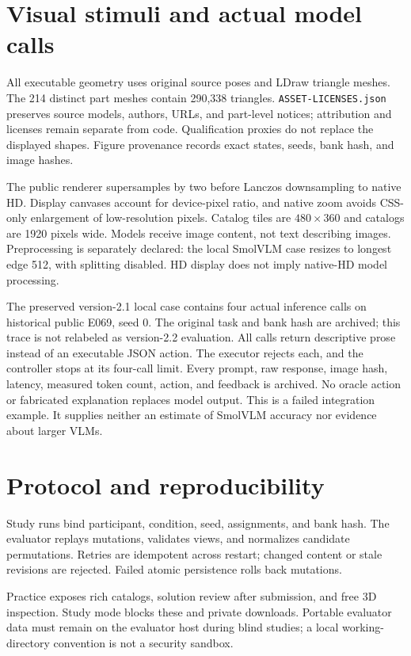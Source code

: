 \section{Visual stimuli and actual model calls}
All executable geometry uses original source poses and LDraw triangle
meshes. The 214 distinct part meshes contain 290,338 triangles.
\texttt{ASSET-LICENSES.json} preserves source models, authors, URLs, and
part-level notices; attribution and licenses remain separate from code.
Qualification proxies do not replace the displayed shapes.
Figure provenance records exact states, seeds, bank hash, and image hashes.

The public renderer supersamples by two before Lanczos downsampling to
native HD. Display canvases account for device-pixel ratio, and native
zoom avoids CSS-only enlargement of low-resolution pixels.
Catalog tiles are $480\times360$ and catalogs are 1920 pixels wide.
Models receive image content, not text describing images. Preprocessing
is separately declared: the local SmolVLM case resizes to longest edge
512, with splitting disabled. HD display does not imply native-HD model
processing.

The preserved version-2.1 local case contains four actual inference calls
on historical public E069, seed 0. The original task and bank hash are
archived; this trace is not relabeled as version-2.2 evaluation.
All calls return descriptive prose instead of an executable JSON action.
The executor rejects each, and the controller stops at its four-call limit.
Every prompt, raw response, image hash, latency, measured token count,
action, and feedback is archived. No oracle action or fabricated explanation
replaces model output. This is a failed integration example. It supplies
neither an estimate of SmolVLM accuracy nor evidence about larger VLMs.

\section{Protocol and reproducibility}
Study runs bind participant, condition, seed, assignments, and bank hash.
The evaluator replays mutations, validates views, and normalizes candidate
permutations. Retries are idempotent across restart; changed content or
stale revisions are rejected. Failed atomic persistence rolls back mutations.

Practice exposes rich catalogs, solution review after submission, and
free 3D inspection. Study mode blocks these and private downloads.
Portable evaluator data must remain on the evaluator host during blind
studies; a local working-directory convention is not a security sandbox.

